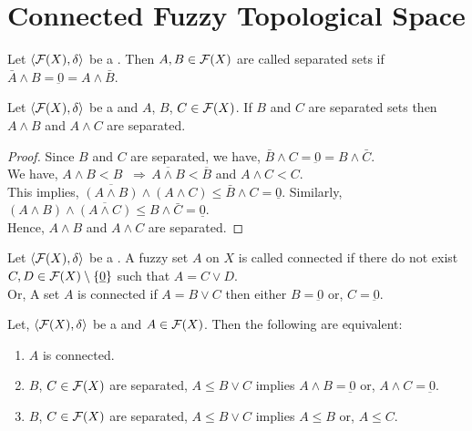 \documentclass[../main-sheet.tex]{subfiles}
\begin{document}
\chapter{Connected Fuzzy Topological Space}
\begin{defn}
    Let \(\langle \mathcal{F}(X), \delta \rangle\) be a \fts. Then \(A,B\in \mathcal{F}(X)\) are called separated sets if \(\bar{A}\wedge B=\underbar{0}=A\wedge\bar{B}\).
\end{defn}
\begin{lem}
    Let \(\langle \mathcal{F}(X), \delta \rangle\) be a \fts\s and \(A\), \(B\), \(C\in \mathcal{F}(X)\). If \(B\) and \(C\) are separated sets then \(A\wedge B\) and \(A\wedge C\) are separated.
\end{lem}
\begin{proof}
    Since \(B\) and \(C\) are separated, we have, \(\bar{B}\wedge C=\underbar{0}=B\wedge\bar{C}\).\\
    We have, \(A\wedge B < B\;\;\Rightarrow\, \overline{A\wedge B}< \overline{B}\) and \(A\wedge C <C\).\\
    This implies, \(\overline{(A\wedge B)}\wedge (A\wedge C)\leq \bar{B}\wedge C=\underline{0}\). Similarly, \((A\wedge B)\wedge \overline{(A\wedge C)}\leq B\wedge \bar{C}=\underline{0}\).\\
    Hence, \(A\wedge B\) and \(A\wedge C\) are separated.
\end{proof}
\begin{defn}
    Let \(\langle \mathcal{F}(X), \delta \rangle\) be a \fts. A fuzzy set \(A\) on \(X\) is called connected if there do not exist \(C,D\in \mathcal{F}(X)\setminus\left\{\underbar{0}\right\}\) such that \(A=C\vee D\).\\
    Or, A set \(A\) is connected if \(A=B\vee C\) then either \(B=\underbar{0}\) or, \(C=\underbar{0}\).
\end{defn}
\begin{thm}
    Let, \(\langle \mathcal{F}(X), \delta \rangle\) be a \fts\space and \(A\in\mathcal{F}(X)\). Then the following are equivalent:
    \begin{enumerate}
        \item \(A\) is connected.
        \item \(B\), \(C\in\mathcal{F}(X)\) are separated, \(A\leq B\vee C\) implies \(A\wedge B=\underbar{0}\) or, \(A\wedge C=\underbar{0}\).
        \item \(B\), \(C\in\mathcal{F}(X)\) are separated, \(A\leq B\vee C\) implies \(A\leq B\) or, \(A\leq C\).
    \end{enumerate}
\end{thm}
\end{document}
